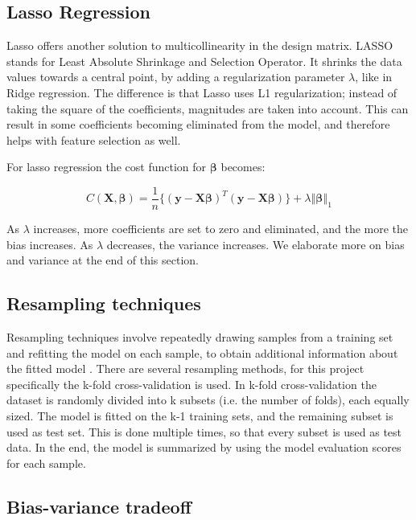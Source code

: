 \documentclass[12pt]{extarticle}
\begin{document}
\subsection{Lasso Regression}

Lasso offers another solution to multicollinearity in the design matrix. LASSO stands for Least Absolute Shrinkage and Selection Operator. It shrinks the data values towards a central point, by adding a regularization parameter $\lambda$, like in Ridge regression. The difference is that Lasso uses L1 regularization; instead of taking the square of the coefficients, magnitudes are taken into account. This can result in some coefficients becoming eliminated from the model, and therefore helps with feature selection as well. \cite{tds2} 

For lasso regression the cost function for $\bm{\beta}$ becomes: 

\begin{equation*}
    C(\bm{X}, \bm{\beta}) = \frac{1}{n} \Big\{(\bm{y} - \bm{X}\bm{\beta})^T(\bm{y} - \bm{X}\bm{\beta})\Big\} + \lambda \left \Vert \bm{\beta} \right \Vert_1
\end{equation*}

As $\lambda$ increases, more coefficients are set to zero and eliminated, and the more the bias increases. As $\lambda$ decreases, the variance increases. We elaborate more on bias and variance at the end of this section.  

\subsection{Resampling techniques}

Resampling techniques involve repeatedly drawing samples from a training set and refitting the model on each sample, to obtain additional information about the fitted model \cite{tds1}. There are several resampling methods, for this project specifically the k-fold cross-validation is used. In k-fold cross-validation the dataset is randomly divided into k subsets (i.e. the number of folds), each equally sized. The model is fitted on the k-1 training sets, and the remaining subset is used as test set. This is done multiple times, so that every subset is used as test data. In the end, the model is summarized by using the model evaluation scores for each sample\cite{lec}.

\subsection{Bias-variance tradeoff}
\end{document}
